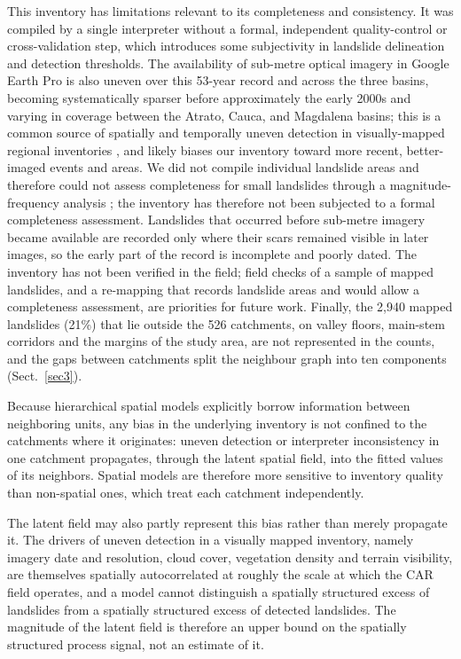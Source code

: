 \documentclass[journal abbreviation, manuscript]{copernicus}
\newcommand{\hl}[1]{#1}
\newcommand{\hlE}[1]{#1}
\begin{document}
\hl{This inventory has limitations relevant to its completeness and consistency. 
It was compiled by a single interpreter without a formal, independent quality-control or cross-validation step, which introduces some subjectivity in landslide delineation and detection thresholds. 
The availability of sub-metre optical imagery in Google Earth Pro is also uneven over this 53-year record and across the three basins, becoming systematically sparser before approximately the early 2000s and varying in coverage between the Atrato, Cauca, and Magdalena basins; this is a common source of spatially and temporally uneven detection in visually-mapped regional inventories }\citep{loche2022landslide}\hl{, and likely biases our inventory toward more recent, better-imaged events and areas. 
We did not compile individual landslide areas and therefore could not assess completeness for small landslides through a magnitude-frequency} \hlE{analysis} \citep{malamud2004landslide, tanyas2020completeness}\hlE{; the inventory has therefore not been subjected to a formal completeness assessment. Landslides that occurred before sub-metre imagery became available are recorded only where their scars remained visible in later images, so the early part of the record is incomplete and poorly dated. The inventory has not been verified in the field; field checks of a sample of mapped landslides, and a re-mapping that records landslide areas and would allow a completeness assessment, are priorities for future work. Finally, the 2,940 mapped landslides (21\%) that lie outside the 526 catchments, on valley floors, main-stem corridors and the margins of the study area, are not represented in the counts, and the gaps between catchments split the neighbour graph into ten components (\mbox{Sect.~\ref{sec3}}).}

\hl{Because hierarchical spatial models explicitly borrow information between neighboring units, any bias in the underlying inventory is not confined to the catchments where it originates: uneven detection or interpreter inconsistency in one catchment propagates, through the latent spatial field, into the fitted values of its neighbors. 
Spatial models are therefore more sensitive to inventory quality than non-spatial ones, which treat each catchment independently.}

\hlE{The latent field may also partly represent this bias rather than merely propagate it. The drivers of uneven detection in a visually mapped inventory, namely imagery date and resolution, cloud cover, vegetation density and terrain visibility, are themselves spatially autocorrelated at roughly the scale at which the CAR field operates, and a model cannot distinguish a spatially structured excess of landslides from a spatially structured excess of detected landslides. The magnitude of the latent field is therefore an upper bound on the spatially structured process signal, not an estimate of it.}
\end{document}
